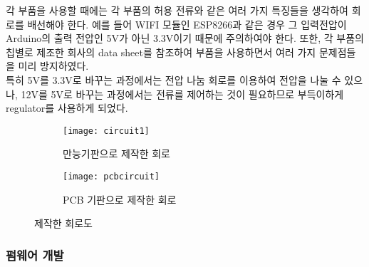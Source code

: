 각 부품을 사용할 때에는 각 부품의 허용 전류와 같은 여러 가지 특징들을 생각하여 회로를 배선해야 한다. 예를 들어 WIFI 모듈인 ESP8266과 같은 경우 그 입력전압이 Arduino의 출력 전압인 5V가 아닌 3.3V이기 때문에 주의하여야 한다. 또한, 각 부품의 칩별로 제조한 회사의 data sheet를 참조하여 부품을 사용하면서 여러 가지 문제점들을 미리 방지하였다.\\
특히 5V를 3.3V로 바꾸는 과정에서는 전압 나눔 회로를 이용하여 전압을 나눌 수 있으나, 12V를 5V로 바꾸는 과정에서는 전류를 제어하는 것이 필요하므로 부득이하게 regulator를 사용하게 되었다.
\begin{figure}[h]
	\begin{subfigure}{0.5\textwidth}
		\texttt{[image: circuit1]} 
		\caption{만능기판으로 제작한 회로}
		\label{fig:circuit1}
	\end{subfigure}
	\begin{subfigure}{0.5\textwidth}
		\texttt{[image: pcbcircuit]}
		\caption{PCB 기판으로 제작한 회로}
		\label{fig:pcbcircuit}
	\end{subfigure}
	\caption{제작한 회로도}
	\label{fig:image2}
\end{figure}

\subsubsection{펌웨어 개발}

